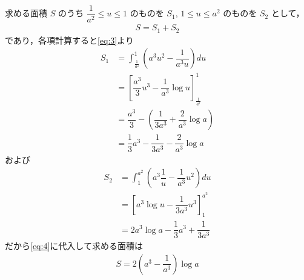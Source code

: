 \documentclass[../../main.tex]{subfiles}
\begin{document}
求める面積 $S$ のうち $\dfrac{1}{a^2} \le u \le 1$ のものを $S_1$, $1 \le u \le a^2$ のものを $S_2$ として，
\begin{align}
  S = S_1 + S_2 \label{eq:4}
\end{align}
であり，各項計算すると\cref{eq:3}より
\begin{align}
  S_1
  &= \int_{\frac{1}{a^2}}^1 \left( a^3 u^2 - \dfrac{1}{a^3 u} \right) du \\
  &= \left[ \dfrac{a^3}{3} u^3 - \dfrac{1}{a^3} \log u \right]_{\frac{1}{a^2}}^1 \\
  &= \dfrac{a^3}{3} - \left( \dfrac{1}{3a^3} + \dfrac{2}{a^3} \log a \right) \\
  &= \dfrac{1}{3}a^3 - \dfrac{1}{3a^3} - \dfrac{2}{a^3}\log a
\end{align}
および
\begin{align}
  S_2
  &= \int_1^{a^2} \left( a^3 \dfrac{1}{u} - \dfrac{1}{a^3} u^2 \right) du \\
  &= \left[ a^3 \log u - \dfrac{1}{3a^3} u^3 \right]_1^{a^2} \\
  &= 2a^3 \log a - \dfrac{1}{3}a^3 + \dfrac{1}{3a^3}
\end{align}
だから\cref{eq:4}に代入して求める面積は
\begin{align}
  S = 2\left(a^3 - \dfrac{1}{a^3}\right)\log a
\end{align}

\newpage
\end{document}
